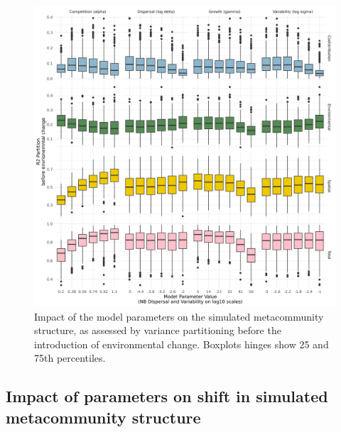 \documentclass[
]{article}
\begin{document}
\begin{figure}
\centering
\includegraphics{SimulationMarkdowns/Figures/ParamStart.png}
\caption{Impact of the model parameters on the simulated metacommunity
structure, as assessed by variance partitioning before the introduction
of environmental change. Boxplots hinges show 25 and 75th percentiles.}
\end{figure}

\hypertarget{impact-of-parameters-on-shift-in-simulated-metacommunity-structure}{%
\subsection{Impact of parameters on shift in simulated metacommunity
structure}\label{impact-of-parameters-on-shift-in-simulated-metacommunity-structure}}
\end{document}
